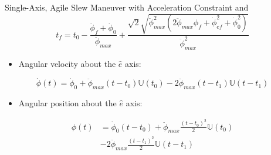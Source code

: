 \documentclass{beamer}
\begin{document}
\begin{frame}
\begin{block}{ Single-Axis, Agile Slew Maneuver with Acceleration Constraint}
and
\begin{equation}
t_f=t_0-\frac{\dot{\phi}_{f}+\dot{\phi}_{0}}{\ddot{\phi}_{max}}+\frac{\sqrt{2}\sqrt{\ddot{\phi}_{max}^2(2\ddot{\phi}_{max}\phi_{f}+\dot{\phi}_{ef}^2+\dot{\phi}_{0}^2)}}{\ddot{\phi}_{max}^2}
\end{equation}
\begin{itemize}
	\item Angular velocity about the $\hat{e}$ axis:
\end{itemize}
\begin{equation}\label{omega}
\dot{\phi}(t)=\dot{\phi}_{0}+\ddot{\phi}_{max}(t-t_0)\mathbb{U}(t_0)- 2\ddot{\phi}_{max}(t-t_1)\mathbb{U}(t-t_1)
\end{equation}
\begin{itemize}
	\item Angular position about the $\hat{e}$ axis:
\end{itemize}
\begin{equation}\label{phi}
\begin{split}
\phi(t)&=\dot{\phi}_{0}(t-t_0)+\ddot{\phi}_{max}\frac{(t-t_0)^2}{2}\mathbb{U}(t_0)\\
&- 2\ddot{\phi}_{max}\frac{(t-t_1)^2}{2}\mathbb{U}(t-t_1)
\end{split}
\end{equation}
\end{block}
\end{frame}
\end{document}
